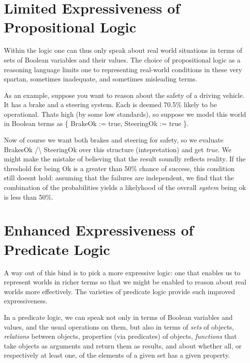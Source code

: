 \documentclass{book}
\begin{document}
\hypertarget{pandoc.profile.debug__pandoc__debug__src__predlogic.md__limited-expressiveness-of-propositional-logic}{%
\section*{Limited Expressiveness of Propositional Logic}\label{pandoc.profile.debug__pandoc__debug__src__predlogic.md__limited-expressiveness-of-propositional-logic}}

Within the logic one can thus only speak about real world
situations in terms of sets of Boolean variables and their
values. The choice of propositional logic as a reasoning
language limits one to representing real-world conditions
in these very spartan, sometimes inadequate, and sometimes
misleading terms.

As an example, suppose you want to reason about the safety
of a driving vehicle. It has a brake and a steering system.
Each is deemed 70.5\% likely to be operational. That\textquotesingle s high
(by some low standards), so suppose we model this world in
Boolean terms as \{ BrakeOk := true, SteeringOk := true \}.

Now of course we want both brakes and steering for safety,
so we evaluate BrakesOk /\textbackslash{} SteeringOk over this structure
(intepretation) and get \emph{true}. We might make the mistake
of believing that the result soundly reflects reality. If
the threshold for being Ok is a greater than 50\% chance of
success, this condition still doesn\textquotesingle t hold: assuming that
the failures are independent, we find that the combination
of the probabilities yields a likelyhood of the overall
\emph{system} being ok is less than 50\%.

\hypertarget{pandoc.profile.debug__pandoc__debug__src__predlogic.md__enhanced-expressiveness-of-predicate-logic}{%
\section*{Enhanced Expressiveness of Predicate Logic}\label{pandoc.profile.debug__pandoc__debug__src__predlogic.md__enhanced-expressiveness-of-predicate-logic}}

A way out of this bind is to pick a more expressive
logic: one that enables us to represent worlds in richer
terms so that we might be enabled to reason about real
worlds more effectively. The varieties of predicate logic
provide such improved expressiveness.

In a predicate logic, we can speak not only in terms of
Boolean variables and values, and the usual operations on
them, but also in terms of \emph{sets} of objects, \emph{relations}
between objects, properties (via predicates) of objects,
\emph{functions} that take objects as arguments and return them
as results, and about whether all, or respectively at least
one, of the elements of a given set has a given property.
\end{document}
